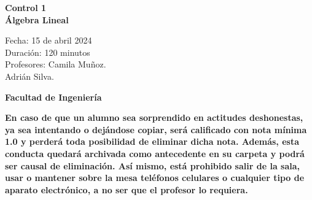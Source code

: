 \documentclass[a4paper]{article}
\begin{document}
\thispagestyle{fancy}
\vspace*{1cm}

\begin{minipage}[r]{12cm}
    \begin{flushright}
    \end{flushright}
\end{minipage}

\begin{center}
\Large{\textbf{Control 1\\ Álgebra Lineal\\ }}
\end{center}
\vspace{1cm}
\begin{minipage}[r]{15cm}
\begin{flushleft}

Fecha: 15 de abril 2024 \\%
Duración: 120 minutos  \\
Profesores: Camila Muñoz.\\\hspace{1.7cm} Adrián Silva.\\
\end{flushleft}
\end{minipage}
\vspace{2cm}
\begin{center}
\Large{\textbf{Facultad de Ingeniería}}
\end{center}
\vspace{1cm}
\textbf{En caso de que un alumno sea sorprendido en actitudes deshonestas, ya sea intentando o
dejándose copiar, será calificado con nota mínima 1.0 y perderá toda posibilidad de eliminar
dicha nota. Además, esta conducta quedará archivada como antecedente en su carpeta y
podrá ser causal de eliminación.
Así mismo, está prohibido salir de la sala, usar o mantener sobre la mesa teléfonos celulares
o cualquier tipo de aparato electrónico, a no ser que el profesor lo requiera.}\\



\vspace{5cm}
\newpage
\thispagestyle{empty}
\end{document}

